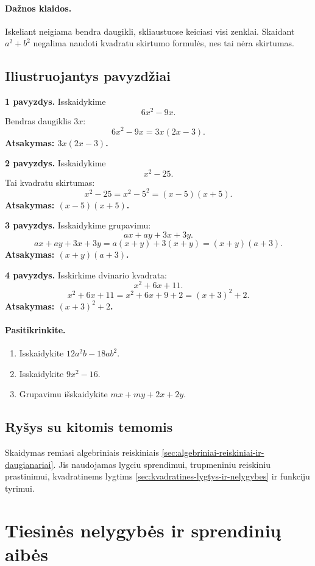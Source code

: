 \paragraph{Dažnos klaidos.}
Iskeliant neigiama bendra daugikli, skliaustuose keiciasi visi zenklai. Skaidant $a^2+b^2$ negalima naudoti kvadratu skirtumo formulės, nes tai nėra skirtumas.

\subsection{Iliustruojantys pavyzdžiai}
\textbf{1 pavyzdys.} Isskaidykime
\[
6x^2-9x.
\]
Bendras daugiklis $3x$:
\[
6x^2-9x=3x(2x-3).
\]
\textbf{Atsakymas: $3x(2x-3)$.}

\textbf{2 pavyzdys.} Isskaidykime
\[
x^2-25.
\]
Tai kvadratu skirtumas:
\[
x^2-25=x^2-5^2=(x-5)(x+5).
\]
\textbf{Atsakymas: $(x-5)(x+5)$.}

\textbf{3 pavyzdys.} Isskaidykime grupavimu:
\[
ax+ay+3x+3y.
\]
\[
ax+ay+3x+3y=a(x+y)+3(x+y)=(x+y)(a+3).
\]
\textbf{Atsakymas: $(x+y)(a+3)$.}

\textbf{4 pavyzdys.} Isskirkime dvinario kvadrata:
\[
x^2+6x+11.
\]
\[
x^2+6x+11=x^2+6x+9+2=(x+3)^2+2.
\]
\textbf{Atsakymas: $(x+3)^2+2$.}

\paragraph{Pasitikrinkite.}
\begin{enumerate}[label=\alph*)]
\item Isskaidykite $12a^2b-18ab^2$.
\item Isskaidykite $9x^2-16$.
\item Grupavimu išskaidykite $mx+my+2x+2y$.
\end{enumerate}

\subsection{Ryšys su kitomis temomis}
Skaidymas remiasi algebriniais reiskiniais \ref{sec:algebriniai-reiskiniai-ir-daugianariai}. Jis naudojamas lygciu sprendimui, trupmeniniu reiskiniu prastinimui, kvadratinems lygtims \ref{sec:kvadratines-lygtys-ir-nelygybes} ir funkciju tyrimui.

\section{Tiesinės nelygybės ir sprendinių aibės}\label{sec:tiesines-nelygybes-ir-sprendiniu-aibes}

